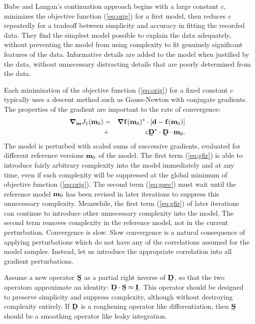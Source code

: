 \documentclass[12pt]{article}
\begin{document}
Bube and Langan's continuation approach begins with a large constant
$c$, minimizes the objective function (\ref{eq:orig}) for a first model,
then reduces $c$ repeatedly for a tradeoff between simplicity
and accuracy in fitting the recorded data.  They find
the simplest model possible to explain the data adequately,
without preventing the model from using complexity 
to fit genuinely significant features of the data.  
Informative details are added to the model when
justified by the data, without unnecessary distracting 
details that are poorly determined from the data.

Each minimization of the objective function (\ref{eq:orig})
for a fixed constant $c$ typically uses a descent method such 
as Gauss-Newton with conjugate gradients.   The properties of the gradient
are important to the rate of convergence:
\begin{eqnarray}
\label{eq:gfir}
\svector{\nabla}_{\svector{\scriptstyle m}} J_1 (\svector{m}_0 ) &=& 
\svector{\nabla} \svector{f} ( \svector{m}_0 )^*
\cdot [ \svector{d} - \svector{f}( \svector{m}_0 ) ] 
\\
\label{eq:gsec}
&+& c \stensor{D}^* \cdot \stensor{D} \cdot \svector{m}_0 .
\end{eqnarray}
The model is perturbed with scaled sums of successive 
gradients, evaluated for different reference versions ${\mbox{\boldmath $\bf m$}}_0$
of the model. 
The first term (\ref{eq:gfir}) is able to introduce fairly
arbitrary complexity into the model immediately and at any time, even if
such complexity will be suppressed at the global
minimum of objective function (\ref{eq:orig}).  The second
term (\ref{eq:gsec}) must wait until the reference
model ${\mbox{\boldmath $\bf m$}}_0$ has been revised in later iterations
to suppress this unnecessary complexity.  Meanwhile, the
first term (\ref{eq:gfir}) of later iterations can continue
to introduce other unnecessary complexity into the model.
The second term removes complexity in the reference model, 
not in the current perturbation.
Convergence is slow.  Slow convergence is 
a natural consequence of applying perturbations which
do not have any of the correlations assumed for the model
samples.  Instead,
let us introduce the appropriate correlation into all gradient 
perturbations.

Assume a new operator $\stensor{S}$ as a partial right inverse
of $\stensor{D}$, so that the two operators approximate
an identity: $\stensor{D} \cdot \stensor{S} \approx \stensor{I}$.
This operator should be designed to preserve simplicity
and suppress complexity, although without destroying complexity
entirely.  If $\stensor{D}$ is a roughening operator like
differentiation, then $\stensor{S}$ should be a smoothing
operator like leaky integration.
\end{document}
